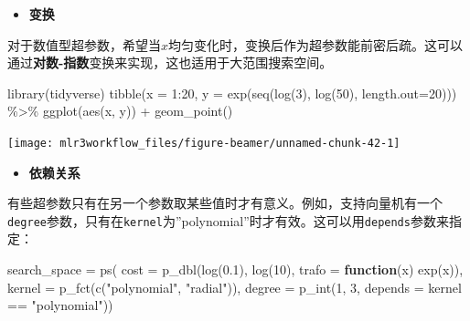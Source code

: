 \documentclass[
  11pt,
  ignorenonframetext,
  dvipsnames,UTF8]{beamer}
\newenvironment{Shaded}{\begin{snugshade}}{\end{snugshade}}
\newcommand{\AttributeTok}[1]{\textcolor[rgb]{0.77,0.63,0.00}{#1}}
\newcommand{\ControlFlowTok}[1]{\textcolor[rgb]{0.13,0.29,0.53}{\textbf{#1}}}
\newcommand{\DecValTok}[1]{\textcolor[rgb]{0.00,0.00,0.81}{#1}}
\newcommand{\FloatTok}[1]{\textcolor[rgb]{0.00,0.00,0.81}{#1}}
\newcommand{\FunctionTok}[1]{\textcolor[rgb]{0.00,0.00,0.00}{#1}}
\newcommand{\NormalTok}[1]{#1}
\newcommand{\OtherTok}[1]{\textcolor[rgb]{0.56,0.35,0.01}{#1}}
\newcommand{\SpecialCharTok}[1]{\textcolor[rgb]{0.00,0.00,0.00}{#1}}
\newcommand{\StringTok}[1]{\textcolor[rgb]{0.31,0.60,0.02}{#1}}
\providecommand{\tightlist}{%
  \setlength{\itemsep}{0pt}\setlength{\parskip}{0pt}}
\begin{document}
\begin{frame}[fragile]{}
\protect\hypertarget{section-33}{}
\begin{itemize}
\tightlist
\item
  \textbf{变换}
\end{itemize}

对于数值型超参数，希望当\(x\)均匀变化时，变换后作为超参数能前密后疏。这可以通过\textbf{对数-指数}变换来实现，这也适用于大范围搜索空间。

\begin{Shaded}
\begin{Highlighting}[]
\FunctionTok{library}\NormalTok{(tidyverse)}
\FunctionTok{tibble}\NormalTok{(}\AttributeTok{x =} \DecValTok{1}\SpecialCharTok{:}\DecValTok{20}\NormalTok{,}
       \AttributeTok{y =} \FunctionTok{exp}\NormalTok{(}\FunctionTok{seq}\NormalTok{(}\FunctionTok{log}\NormalTok{(}\DecValTok{3}\NormalTok{), }\FunctionTok{log}\NormalTok{(}\DecValTok{50}\NormalTok{), }\AttributeTok{length.out=}\DecValTok{20}\NormalTok{))) }\SpecialCharTok{\%\textgreater{}\%}
  \FunctionTok{ggplot}\NormalTok{(}\FunctionTok{aes}\NormalTok{(x, y)) }\SpecialCharTok{+} 
  \FunctionTok{geom\_point}\NormalTok{()}
\end{Highlighting}
\end{Shaded}
\end{frame}

\begin{frame}{}
\protect\hypertarget{section-34}{}
\begin{center}\texttt{[image: mlr3workflow\_files/figure-beamer/unnamed-chunk-42-1]} \end{center}
\end{frame}

\begin{frame}[fragile]{}
\protect\hypertarget{section-35}{}
\begin{itemize}
\tightlist
\item
  \textbf{依赖关系}
\end{itemize}

有些超参数只有在另一个参数取某些值时才有意义。例如，支持向量机有一个\texttt{degree}参数，只有在\texttt{kernel}为''polynomial''时才有效。这可以用\texttt{depends}参数来指定：

\begin{Shaded}
\begin{Highlighting}[]
\NormalTok{search\_space }\OtherTok{=} \FunctionTok{ps}\NormalTok{(}
  \AttributeTok{cost =} \FunctionTok{p\_dbl}\NormalTok{(}\FunctionTok{log}\NormalTok{(}\FloatTok{0.1}\NormalTok{), }\FunctionTok{log}\NormalTok{(}\DecValTok{10}\NormalTok{), }
               \AttributeTok{trafo =} \ControlFlowTok{function}\NormalTok{(x) }\FunctionTok{exp}\NormalTok{(x)),}
  \AttributeTok{kernel =} \FunctionTok{p\_fct}\NormalTok{(}\FunctionTok{c}\NormalTok{(}\StringTok{"polynomial"}\NormalTok{, }\StringTok{"radial"}\NormalTok{)),}
  \AttributeTok{degree =} \FunctionTok{p\_int}\NormalTok{(}\DecValTok{1}\NormalTok{, }\DecValTok{3}\NormalTok{, }\AttributeTok{depends =}\NormalTok{ kernel }\SpecialCharTok{==} \StringTok{"polynomial"}\NormalTok{))}
\end{Highlighting}
\end{Shaded}
\end{frame}
\end{document}
